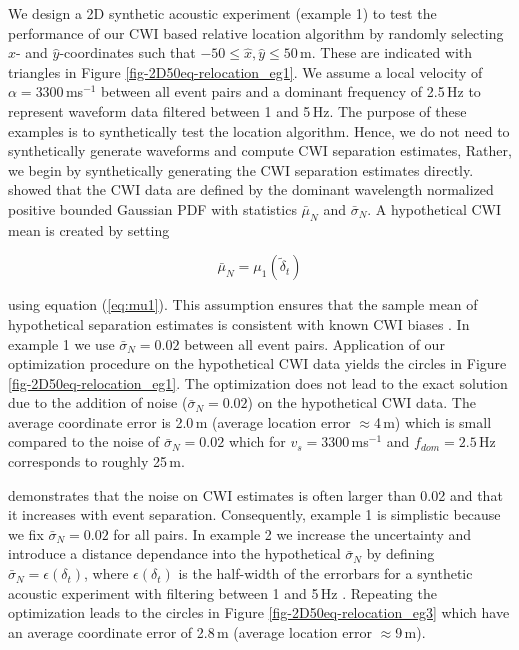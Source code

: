 \documentclass[12pt,double]{article}
\begin{document}
We design a 2D synthetic acoustic experiment (example 1) to test the 
performance of our CWI based relative location algorithm by randomly
selecting $\hat{x}$- and $\hat{y}$-coordinates such that $-50 \leq
\hat{x}, \hat{y} \leq 50$\,m. These are indicated with triangles in
Figure \ref{fig-2D50eq-relocation_eg1}.
 We assume a local velocity of $\alpha=3300\,$ms$^{-1}$ between all
event pairs and a dominant frequency of 2.5$\,$Hz to represent
waveform data filtered between 1 and 5$\,$Hz. The purpose of these
examples is to synthetically test the location algorithm. 
Hence, we do not need to synthetically generate waveforms and compute
CWI separation estimates, Rather, we begin by synthetically generating 
the CWI separation estimates directly. \citet{dr_Robinson11a} showed that
the CWI data are
defined by the dominant wavelength normalized positive bounded
Gaussian PDF with statistics $\bar{\mu}_N$ and $\bar{\sigma}_N$. 
A hypothetical CWI mean is created by
setting
\begin{linenomath*} \begin{equation} 
\label{eq:hypothetical-CWI-mean-optichapt}
\bar{\mu}_N = \mu_1 \left( \widetilde{\delta}_t \right)
\end{equation} \end{linenomath*}
using equation (\ref{eq:mu1}). This assumption ensures that the
sample mean of hypothetical separation estimates is consistent with
known CWI biases \citep{dr_Robinson11a}. In example 1 we use
$\bar{\sigma}_N=0.02$ between all event pairs. Application of our
optimization procedure on the hypothetical CWI data yields the
circles in Figure \ref{fig-2D50eq-relocation_eg1}. The optimization
does not lead to the exact solution due to the addition of noise
($\bar{\sigma}_N=0.02$) on the hypothetical CWI data. The average
coordinate error is 2.0\,m  (average location error $\approx$4\,m) 
which is small compared to the noise of
$\bar{\sigma}_N=0.02$ which for $v_s=3300$\,ms$^{-1}$ and
$f_{dom}=2.5$\,Hz corresponds to roughly 25\,m.

\citet{dr_Robinson11a} demonstrates that the noise on CWI estimates
is often larger than 0.02 and that it increases with event
separation. Consequently, example 1 is simplistic because we fix
$\bar{\sigma}_N=0.02$ for all pairs. In example 2 we increase the
uncertainty and introduce a distance dependance into the
hypothetical $\bar{\sigma}_N$ by defining
$\bar{\sigma}_N=\epsilon(\delta_t)$, where
$\epsilon(\delta_t)$ is the half-width of the errorbars for a
synthetic acoustic experiment with filtering between 1 and 5\,Hz
\citep[see Fig. 4(b) of ][]{dr_Robinson11a}. Repeating the
optimization leads to the circles in Figure
\ref{fig-2D50eq-relocation_eg3} which have an average coordinate
error of 2.8\,m (average location error $\approx$9\,m).
\end{document}

